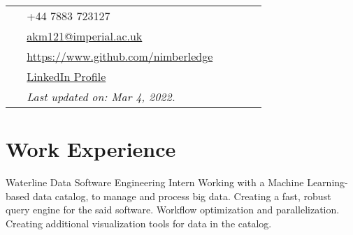 \documentclass[10pt, oneside, openany]{article} %
\begin{document}
\begin{paracol}{2}
\parbox[top][0.09\textheight][c]{\linewidth}{ %
	\vspace{-0.05\textheight} %
	\colorbox{shade}{ %
		\begin{supertabular}{p{0.05\linewidth}|p{0.775\linewidth}} %
			\raisebox{-1pt}{\faPhone} & +44 7883 723127 \\ %
			\raisebox{0pt}{\small\faEnvelope} & \href{mailto:akm121@imperial.ac.uk}{akm121@imperial.ac.uk} \\ %
			\raisebox{-1pt}{\faGithub} & \href{https://www.github.com/nimberledge}{https://www.github.com/nimberledge} \\ %
			\raisebox{-1pt}{\faLinkedinSquare} & \href{https://www.linkedin.com/in/akhil-krishna-m-a308a8131/}{LinkedIn Profile} \\ %
			\raisebox{-1pt}{} & \textit{Last updated on: Mar 4, 2022.}\\
		\end{supertabular}
	}
}


\section{Work Experience}




{} %
{Waterline Data} %
{Software Engineering Intern} %
{Working with a Machine Learning-based data catalog, to manage and process big data. Creating a fast, robust query engine for the said software. Workflow optimization and parallelization. Creating additional visualization tools for data in the catalog.}%


\end{paracol}
\end{document}
